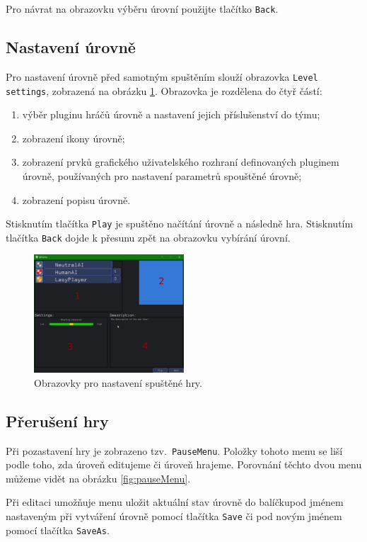 Pro návrat na obrazovku výběru úrovní použijte tlačítko \texttt{Back}.

\subsection{Nastavení úrovně}
Pro nastavení úrovně před samotným spuštěním slouží obrazovka \texttt{Level settings}, zobrazená na obrázku \ref{fig:levelsettings}. Obrazovka je rozdělena do čtyř částí:

\begin{enumerate}
	\item výběr pluginu hráčů úrovně a nastavení jejich příslušenství do týmu;
	\item zobrazení ikony úrovně;
	\item zobrazení prvků grafického uživatelského rozhraní definovaných pluginem úrovně, používaných pro nastavení parametrů spouštěné úrovně;
	\item zobrazení popisu úrovně.
\end{enumerate}

Stisknutím tlačítka \texttt{Play} je spuštěno načítání úrovně a následně hra. Stisknutím tlačítka \texttt{Back} dojde k přesunu zpět na obrazovku vybírání úrovní.

\begin{figure}[h]
	\centering
	\includegraphics[width=0.5\textwidth]{img/LevelSettingsScreen.png}
	\caption{Obrazovky pro nastavení spuštěné hry.}
	\label{fig:levelsettings}
\end{figure}

\subsection{Přerušení hry}
Při pozastavení hry je zobrazeno tzv.~\texttt{PauseMenu}. Položky tohoto menu se liší podle toho, zda úroveň editujeme či úroveň hrajeme. Porovnání těchto dvou menu můžeme vidět na obrázku \ref{fig:pauseMenu}.

Při editaci umožňuje menu uložit aktuální stav úrovně do balíčkupod jménem nastaveným při vytváření úrovně pomocí tlačítka \texttt{Save} či pod novým jménem pomocí tlačítka \texttt{SaveAs}.

